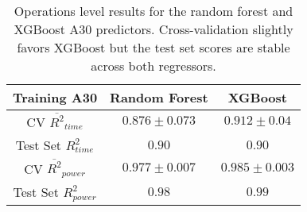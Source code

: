 \begin{table}[h!]
\centering
\begin{tabular}{|c|c|c|}
\hline
 \textbf{Training A30}& \textbf{Random Forest} & \textbf{XGBoost} \\
\hline
CV $\overline{R^2}_{time}$ & $0.876 \pm 0.073$ &  $0.912 \pm 0.04$ \\
\hline
Test Set $R^2_{time}$ & $0.90$ & $0.90$ \\
\hline
CV $\overline{R^2}_{power}$ & $0.977 \pm 0.007$  &  $0.985 \pm 0.003$\\
\hline
Test Set $R^2_{power}$ & $0.98$ & $0.99$ \\
\hline
\end{tabular}
\caption{Operations level results for the random forest and XGBoost A30 predictors. Cross-validation slightly favors XGBoost but the test set scores are stable across both regressors.}
\label{tab:pred_res}
\end{table}






